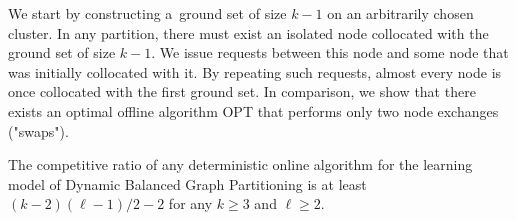 \documentclass[a4paper,anonymous,USenglish]{lipics-v2019}
\newcommand{\OPT}{\textsc{OPT}\xspace}
\begin{document}
We start by constructing a~ground set of size $k-1$ on an arbitrarily chosen cluster.
In any partition, there must exist an isolated node collocated with the ground set of size $k-1$.
We issue requests between this node and some node that was initially collocated with it.
By repeating such requests, almost every node is once collocated with the first ground set.
In comparison, we show that there exists an optimal offline algorithm \OPT that performs only two node exchanges ("swaps").


\begin{theorem}
	\label{th:lowerbound}
	The competitive ratio of any deterministic online algorithm for the learning model of Dynamic Balanced Graph Partitioning is at least
	 $(k-2)(\ell-1)/2 - 2$ for any $k\geq 3$ and $\ell \geq 2$.
\end{theorem}
\end{document}
